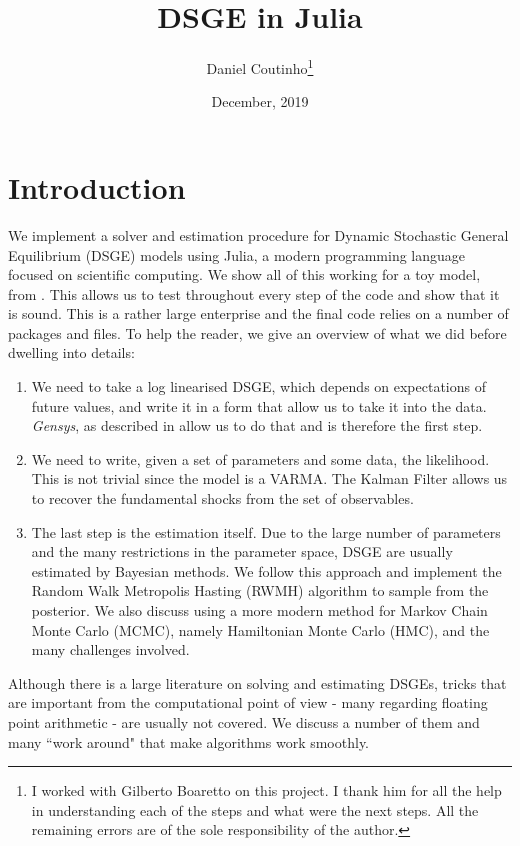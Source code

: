 \documentclass[12pt,a4paper]{article}
\title{ DSGE in Julia }
\author{Daniel Coutinho\footnote{I worked with Gilberto Boaretto on this project. I thank him for all the help in understanding each of the steps and what were the next steps. All the remaining errors are of the sole responsibility of the author.}}
\date{ December, 2019 }
\begin{document}
\maketitle

\section{Introduction}
We implement a solver and estimation procedure for Dynamic Stochastic General Equilibrium (DSGE) models using Julia, a modern programming language focused on scientific computing. We show all of this working for a toy model, from \cite{Gali2009}. This allows us to test throughout every step of the code and show that it is sound. This is a rather large enterprise and the final code relies on a number of packages and files. To help the reader, we give an overview of what we did before dwelling into details:

\begin{enumerate}
\item We need to take a log linearised DSGE, which depends on expectations of future values, and write it in a form that allow us to take it into the data. \emph{Gensys}, as described in \cite{Sims2002} allow us to do that and is therefore the first step.


\item We need to write, given a set of parameters and some data, the likelihood. This is not trivial since the model is a VARMA. The Kalman Filter allows us to recover the fundamental shocks from the set of observables.


\item The last step is the estimation itself. Due to the large number of parameters and the many restrictions in the parameter space, DSGE are usually estimated by Bayesian methods. We follow this approach and implement the Random Walk Metropolis Hasting (RWMH) algorithm to sample from the posterior. We also discuss using a more modern method for Markov Chain Monte Carlo (MCMC), namely Hamiltonian Monte Carlo (HMC), and the many challenges involved.

\end{enumerate}

Although there is a large literature on solving and estimating DSGEs, tricks that are important from the computational point of view - many regarding floating point arithmetic - are usually not covered. We discuss a number of them and many ``work around" that make algorithms work smoothly.
\end{document}
